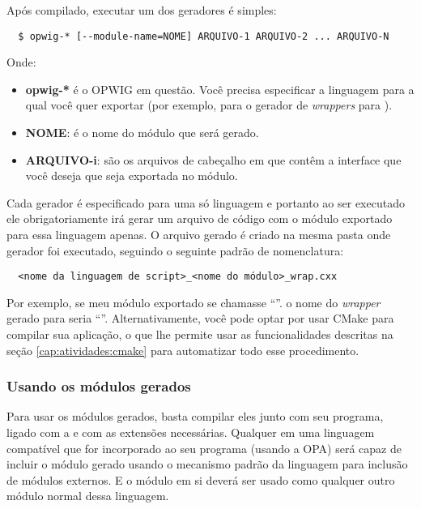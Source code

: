 Após compilado, executar um dos geradores é simples:
\begin{verbatim}
  $ opwig-* [--module-name=NOME] ARQUIVO-1 ARQUIVO-2 ... ARQUIVO-N
\end{verbatim}

Onde:
\begin{itemize}
  \item \textbf{opwig-*} é o OPWIG em questão. Você precisa especificar a
        linguagem para a qual você quer exportar (por exemplo, 
        para o gerador de \textit{wrappers} para ).
  \item \textbf{NOME}: é o nome do módulo que será gerado.
  \item \textbf{ARQUIVO-i}: são os arquivos de cabeçalho em \CXX{} que contêm a interface
        que você deseja que seja exportada no módulo.
\end{itemize}

Cada gerador é especificado para uma só linguagem e portanto ao ser executado
ele obrigatoriamente irá gerar um arquivo de código com o módulo exportado para
essa linguagem apenas. O arquivo gerado é criado na mesma pasta onde gerador foi
executado, seguindo o seguinte padrão de nomenclatura:
\begin{verbatim}
  <nome da linguagem de script>_<nome do módulo>_wrap.cxx
\end{verbatim}

Por exemplo, se meu módulo exportado se chamasse ``''. o nome
do \textit{wrapper} gerado para  seria ``''.
Alternativamente, você pode optar por usar CMake para compilar sua aplicação, o que
lhe permite usar as funcionalidades descritas na seção \ref{cap:atividades:cmake}
para automatizar todo esse procedimento.

\subsubsection{Usando os módulos gerados}

Para usar os módulos gerados, basta compilar eles junto com seu programa, ligado com
a  e com as extensões necessárias. Qualquer \script{} em uma
linguagem compatível que for incorporado ao seu programa (usando a OPA) será
capaz de incluir o módulo gerado usando o mecanismo padrão da linguagem para
inclusão de módulos externos. E o módulo em si deverá ser usado como qualquer
outro módulo normal dessa linguagem.


